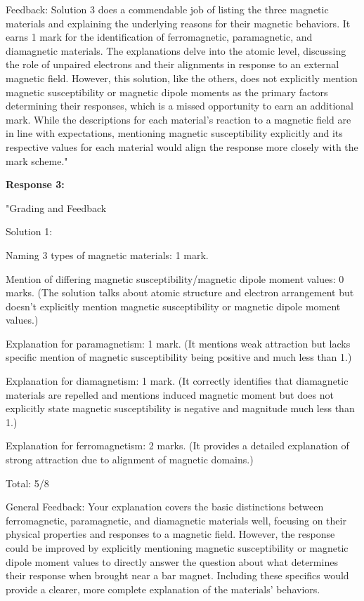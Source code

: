 \documentclass[a4paper,11pt]{article}
\begin{document}
Feedback: Solution 3 does a commendable job of listing the three magnetic materials and explaining the underlying reasons for their magnetic behaviors. It earns 1 mark for the identification of ferromagnetic, paramagnetic, and diamagnetic materials. The explanations delve into the atomic level, discussing the role of unpaired electrons and their alignments in response to an external magnetic field. However, this solution, like the others, does not explicitly mention magnetic susceptibility or magnetic dipole moments as the primary factors determining their responses, which is a missed opportunity to earn an additional mark. While the descriptions for each material's reaction to a magnetic field are in line with expectations, mentioning magnetic susceptibility explicitly and its respective values for each material would align the response more closely with the mark scheme."

\textbf{Response 3:}

"Grading and Feedback

Solution 1:

Naming 3 types of magnetic materials: 1 mark.

Mention of differing magnetic susceptibility/magnetic dipole moment values: 0 marks. (The solution talks about atomic structure and electron arrangement but doesn't explicitly mention magnetic susceptibility or magnetic dipole moment values.)

Explanation for paramagnetism: 1 mark. (It mentions weak attraction but lacks specific mention of magnetic susceptibility being positive and much less than 1.)

Explanation for diamagnetism: 1 mark. (It correctly identifies that diamagnetic materials are repelled and mentions induced magnetic moment but does not explicitly state magnetic susceptibility is negative and magnitude much less than 1.)

Explanation for ferromagnetism: 2 marks. (It provides a detailed explanation of strong attraction due to alignment of magnetic domains.)

Total: 5/8

General Feedback:
Your explanation covers the basic distinctions between ferromagnetic, paramagnetic, and diamagnetic materials well, focusing on their physical properties and responses to a magnetic field. However, the response could be improved by explicitly mentioning magnetic susceptibility or magnetic dipole moment values to directly answer the question about what determines their response when brought near a bar magnet. Including these specifics would provide a clearer, more complete explanation of the materials' behaviors.
\end{document}
